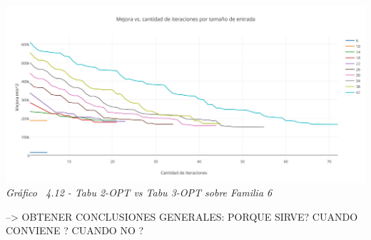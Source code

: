   \vspace*{0.3cm} \vspace*{0.3cm}
  \begin{center}
 \includegraphics[scale=0.5]{./EJ4/mejora2.png}\\
 {            \textit{Gráfico \ 4.12 - Tabu 2-OPT vs Tabu 3-OPT sobre Familia 6}}
  \end{center}
  \vspace*{0.3cm}
  
--> OBTENER CONCLUSIONES GENERALES: PORQUE SIRVE? CUANDO CONVIENE ? CUANDO NO ? 
  
